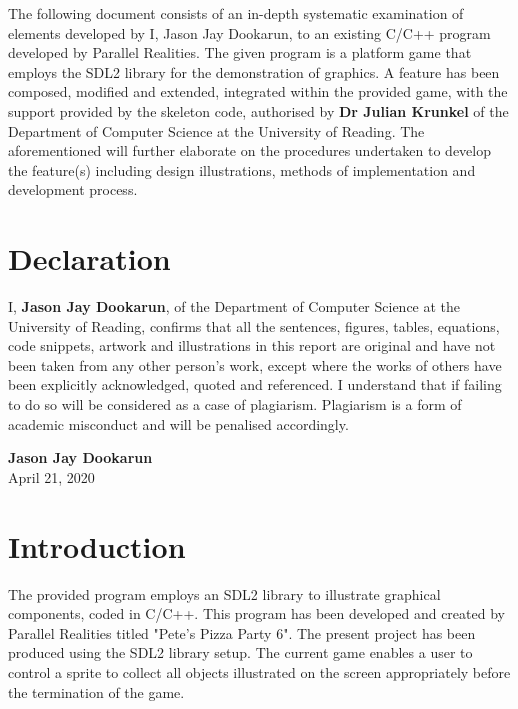 \documentclass{article}
\begin{document}
The following document consists of an in-depth systematic examination of elements developed by I, Jason Jay Dookarun, to an existing C/C++ program developed by Parallel Realities. The given program is a platform game that employs the SDL2 library for the demonstration of graphics. A feature has been composed, modified and extended, integrated within the provided game, with the support provided by the skeleton code, authorised by \textbf{Dr Julian Krunkel} of the Department of Computer Science at the University of Reading. The aforementioned will further elaborate on the procedures undertaken to develop the feature(s) including design illustrations, methods of implementation and development process.

\section*{Declaration}

I, \textbf{Jason Jay Dookarun}, of the Department of Computer Science at the University of Reading, confirms that all the sentences, figures, tables, equations, code snippets, artwork and illustrations in this report are original and have not been taken from any other person’s work, except where the works of others have been explicitly acknowledged, quoted and referenced. I understand that if failing to do so will be considered as a case of plagiarism. Plagiarism is a form of academic misconduct and will be penalised accordingly.

    \begin{flushright}
    \textbf{Jason Jay Dookarun} \\
    April 21, 2020\\
    [1cm]
    \end{flushright}

\cleardoublepage
\tableofcontents
\thispagestyle{empty}

\listoffigures
{}
\cleardoublepage





\newpage
\section{Introduction}\label{sec:intro}
The provided program employs an SDL2 library to illustrate graphical components, coded in C/C++. This program has been developed and created by Parallel Realities titled "Pete's Pizza Party 6". The present project has been produced using the SDL2 library setup. The current game enables a user to control a sprite to collect all objects illustrated on the screen appropriately before the termination of the game.
\end{document}
